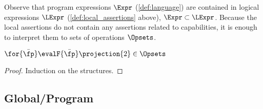 
Observe that program expressions $\Expr$  (\ref{def:language}) are contained in logical expressions $\LExpr$ (\ref{def:local_assertions} above), \ie $\Expr \subset \LExpr$. 
Because the local assertions do not contain any assertions related to capabilities, it is enough to interpret them to sets of operations \( \Opsets \).

\begin{lem}
\(
    \for{\bar{\fp}} \evalF{\bar{\fp}}\projection{2} \in \Opsets
\)
\end{lem}
\begin{proof}
Induction on the structures.
\end{proof}


\subsection{Global/Program}


